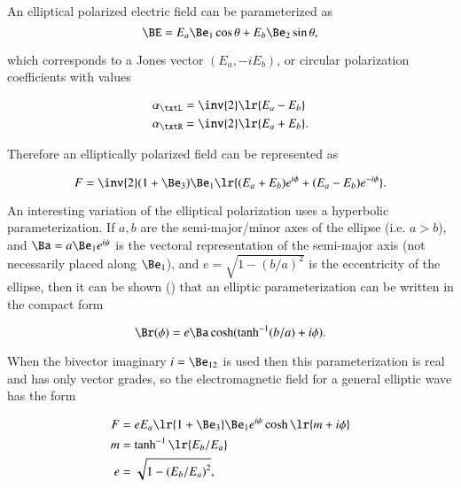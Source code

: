 %
%
An elliptical polarized electric field can be parameterized as
\begin{dmath}\label{eqn:polarization_elliptical:340}
\BE
=
E_a \Be_1 \cos\theta + E_b \Be_2 \sin\theta,
\end{dmath}

which corresponds to a Jones vector \( (E_a, -i E_b) \), or circular polarization coefficients with values

\begin{dmath}\label{eqn:polarization_elliptical:400}
\begin{aligned}
\alpha_\txtL &= \inv{2}\lr{ E_a - E_b } \\
\alpha_\txtR &= \inv{2}\lr{ E_a + E_b }.
\end{aligned}
\end{dmath}

Therefore an elliptically polarized field can be represented as

\begin{dmath}\label{eqn:polarization_elliptical:420}
F = \inv{2} (1 + \Be_3) \Be_1 \lr{ (E_a + E_b) e^{i\phi} + (E_a - E_b) e^{-i\phi} }.
\end{dmath}

An interesting variation of the elliptical polarization uses a hyperbolic parameterization.
If \( a, b \) are the semi-major/minor axes of the ellipse (i.e. \( a > b \)),
and \( \Ba = a \Be_1 e^{i\psi} \) is the vectoral representation of the semi-major axis (not necessarily placed along \( \Be_1 \)),
and \( e = \sqrt{1 - (b/a)^2} \) is the eccentricity of the ellipse,
then it can be shown (\citep{hestenes1999nfc})
that an elliptic parameterization can be written
in the compact form

\begin{dmath}\label{eqn:polarization_elliptical:360}
\Br(\phi)
=
e \Ba \cosh( \tanh^{-1}(b/a) + i \phi).
\end{dmath}

When the bivector imaginary \( i = \Be_{12} \) is used then
this parameterization is real and has only vector grades, so the electromagnetic field for a general elliptic wave has the form

\begin{dmath}\label{eqn:polarization_elliptical:380}
\begin{aligned}
F &= e E_a \lr{ 1 + \Be_3 } \Be_1 e^{ i \psi } \cosh\lr{ m + i \phi} \\
m &= \tanh^{-1}\lr{ E_b/E_a } \\
e &= \sqrt{1 - {(E_b/E_a)}^2 },
\end{aligned}
\end{dmath}

